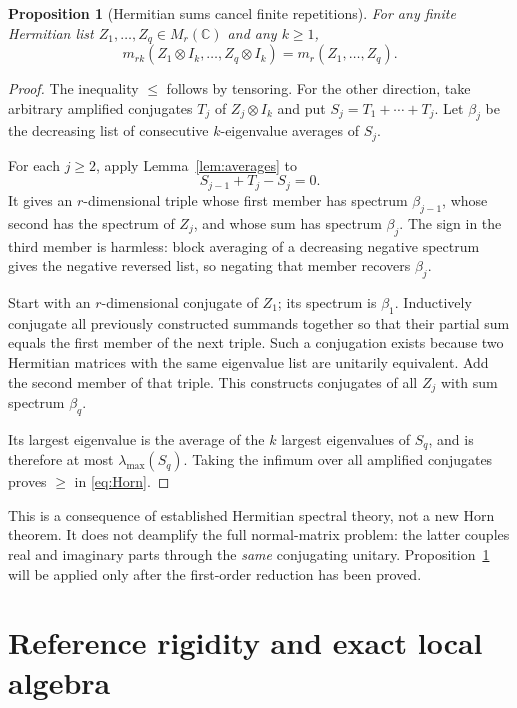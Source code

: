 \documentclass[11pt]{article}
\newtheorem{proposition}[theorem]{Proposition}
\theoremstyle{remark}\newtheorem{remark}[theorem]{Remark}
\newcommand{\C}{\mathbb C}
\begin{document}
\begin{proposition}[Hermitian sums cancel finite repetitions]\label{prop:Horn}
For any finite Hermitian list $Z_1,\ldots,Z_q\in M_r(\C)$ and any $k\ge1$,
\begin{equation}\label{eq:Horn}
 m_{rk}(Z_1\otimes I_k,\ldots,Z_q\otimes I_k)=m_r(Z_1,\ldots,Z_q).
\end{equation}
\end{proposition}
\begin{proof}
The inequality $\le$ follows by tensoring. For the other direction, take arbitrary amplified conjugates $T_j$ of $Z_j\otimes I_k$ and put $S_j=T_1+\cdots+T_j$. Let $\beta_j$ be the decreasing list of consecutive $k$-eigenvalue averages of $S_j$.

For each $j\ge2$, apply Lemma~\ref{lem:averages} to
\[
 S_{j-1}+T_j-S_j=0.
\]
It gives an $r$-dimensional triple whose first member has spectrum $\beta_{j-1}$, whose second has the spectrum of $Z_j$, and whose sum has spectrum $\beta_j$. The sign in the third member is harmless: block averaging of a decreasing negative spectrum gives the negative reversed list, so negating that member recovers $\beta_j$.

Start with an $r$-dimensional conjugate of $Z_1$; its spectrum is $\beta_1$. Inductively conjugate all previously constructed summands together so that their partial sum equals the first member of the next triple. Such a conjugation exists because two Hermitian matrices with the same eigenvalue list are unitarily equivalent. Add the second member of that triple. This constructs conjugates of all $Z_j$ with sum spectrum $\beta_q$.

Its largest eigenvalue is the average of the $k$ largest eigenvalues of $S_q$, and is therefore at most $\lambda_{\max}(S_q)$. Taking the infimum over all amplified conjugates proves $\ge$ in \eqref{eq:Horn}.
\end{proof}

This is a consequence of established Hermitian spectral theory, not a new Horn theorem. It does not deamplify the full normal-matrix problem: the latter couples real and imaginary parts through the \emph{same} conjugating unitary. Proposition~\ref{prop:Horn} will be applied only after the first-order reduction has been proved.

\section{Reference rigidity and exact local algebra}
\end{document}

